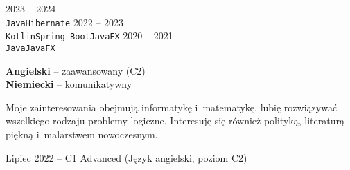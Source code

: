 \documentclass[8pt]{developercv} %
\begin{document}


\begin{entrylist}
    \entry
		{2023 -- 2024}
		{\lorem}
		{}
		{\lorem \lorem \lorem\\ \texttt{Java}\slashsep\texttt{Hibernate}}
	\entry
		{2022 -- 2023}
		{\lorem}
		{}
		{\lorem \lorem \lorem\\ \texttt{Kotlin}\slashsep\texttt{Spring Boot}\slashsep\texttt{JavaFX}}
	\entry
		{2020 -- 2021}
		{\lorem}
		{}
		{\lorem \lorem \lorem\\ \texttt{Java}\slashsep\texttt{JavaFX}}
\end{entrylist}



\begin{minipage}[t]{0.3\textwidth}
  \vspace{-\baselineskip}


  \textbf{Angielski} -- zaawansowany (C2)\\
  \textbf{Niemiecki} -- komunikatywny
\end{minipage}
\hfill
\begin{minipage}[t]{0.3\textwidth}
  \vspace{-\baselineskip}


  Moje zainteresowania obejmują informatykę i~matematykę,
  lubię rozwiązywać wszelkiego rodzaju problemy logiczne.
  Interesuję się również polityką, literaturą piękną i~malarstwem nowoczesnym.
\end{minipage}
\hfill
\begin{minipage}[t]{0.35\textwidth}
  \vspace{-\baselineskip}

  Lipiec 2022 -- C1 Advanced (Język angielski, poziom C2)
\end{minipage}

\end{document}
